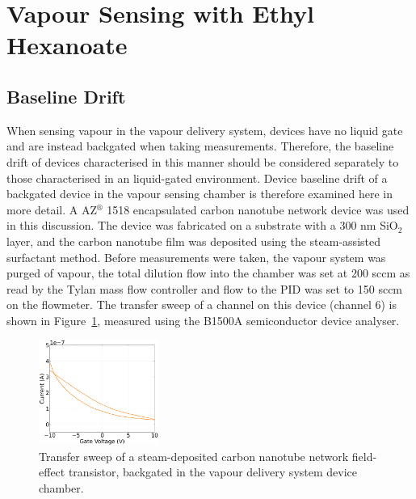 \documentclass[
  a4paper,
]{scrbook}
\begin{document}
\hypertarget{sec-pristine-EtHex}{%
\section{Vapour Sensing with Ethyl Hexanoate}\label{sec-pristine-EtHex}}

\hypertarget{sec-vapour-drift}{%
\subsection{Baseline Drift}\label{sec-vapour-drift}}

When sensing vapour in the vapour delivery system, devices have no
liquid gate and are instead backgated when taking measurements.
Therefore, the baseline drift of devices characterised in this manner
should be considered separately to those characterised in an
liquid-gated environment. Device baseline drift of a backgated device in
the vapour sensing chamber is therefore examined here in more detail. A
AZ\(^\circledR\) 1518 encapsulated carbon nanotube network device was
used in this discussion. The device was fabricated on a substrate with a
300 nm SiO\(_2\) layer, and the carbon nanotube film was deposited using
the steam-assisted surfactant method. Before measurements were taken,
the vapour system was purged of vapour, the total dilution flow into the
chamber was set at 200 sccm as read by the Tylan mass flow controller
and flow to the PID was set to 150 sccm on the flowmeter. The transfer
sweep of a channel on this device (channel 6) is shown in
Figure~\ref{fig-backgate-transfer}, measured using the B1500A
semiconductor device analyser.

\begin{figure}

{\centering \includegraphics[width=0.35\textwidth,height=\textheight]{figures/ch6/Q2C6_backgate_characterisation.png}

}

\caption{\label{fig-backgate-transfer}Transfer sweep of a
steam-deposited carbon nanotube network field-effect transistor,
backgated in the vapour delivery system device chamber.}

\end{figure}
\end{document}
